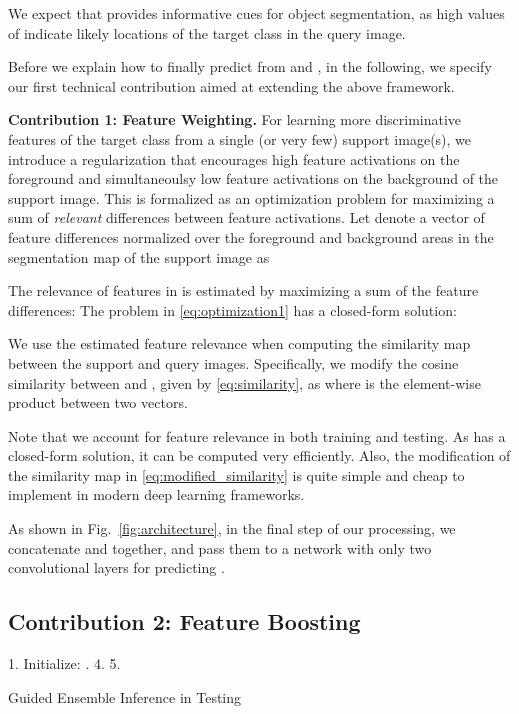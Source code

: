 \documentclass[10pt,twocolumn,letterpaper]{article}
\begin{document}
We expect that   provides informative cues for object segmentation, as high values of   indicate likely locations of the target class in the query image. 

Before we explain how to finally predict  from  and , in the following, we specify our first technical contribution aimed at extending the above framework. 

 
\vspace{5pt}

\noindent
{\bf Contribution 1: Feature Weighting.}
For learning more discriminative features of the target class from a single (or very few) support image(s), we introduce a regularization that encourages high feature activations  on the foreground and simultaneoulsy low  feature activations  on the background of the support image. 
This is formalized as an optimization problem for maximizing a sum of {\em relevant}   
differences between feature activations. Let  denote a vector of feature differences normalized over the foreground and background areas in the segmentation map of the support image as

The relevance  of features in  is estimated by maximizing a sum of the feature differences:
The problem in \eqref{eq:optimization1} has a closed-form solution:




We use the estimated feature relevance  when computing the similarity map between the support and query images. Specifically, we modify the cosine similarity between  and , given by \eqref{eq:similarity}, as
where  is the element-wise product between two vectors. 

Note that we account for feature relevance in both training and testing. As  has a closed-form solution, it can be computed very efficiently. Also, the modification of the similarity map in \eqref{eq:modified_similarity} is quite simple and cheap to implement in modern deep learning frameworks. 

As shown in Fig.~\ref{fig:architecture}, in the final step of our processing, we concatenate  and  together, and pass them to a network with only two convolutional layers for predicting .


\subsection{Contribution 2: Feature Boosting}
\label{sec:ensemble}


\begin{algorithm}[b]

\label{algo:1}
 \KwIn{, , , ,  }
 \KwOut{}
 1. Initialize: . 
 4. 
  5. 
 \caption{Guided Ensemble Inference in Testing}

\end{algorithm}
\end{document}
